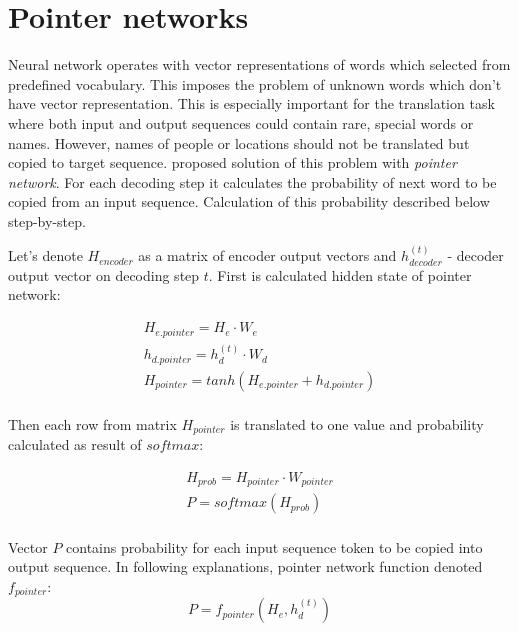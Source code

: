 \section{Pointer networks} \label{pointer}
Neural network operates with vector representations of words which selected from predefined vocabulary. This imposes the problem of unknown words which don't have vector representation. This is especially important for the translation task where both input and output sequences could contain rare, special words or names. However, names of people or locations should not be translated but copied to target sequence. \cite{Vinyals2015} proposed solution of this problem with \emph{pointer network}. For each decoding step it calculates the probability of next word to be copied from an input sequence. Calculation of this probability described below step-by-step.

Let's denote $H_{encoder}$ as a matrix of encoder output vectors and $h_{decoder}^{(t)}$ - decoder output vector on decoding step $t$. First is calculated hidden state of pointer network:

\begin{equation}
    \begin{gathered}
    
    H_{e.pointer} = H_e \cdot W_{e}\\
    
    h_{d.pointer} = h_{d}^{(t)} \cdot W_{d}\\
    
    H_{pointer} = tanh(H_{e.pointer} + h_{d.pointer})\\
    
    \end{gathered}
    \label{eq:pointer}
\end{equation}

Then each row from matrix $H_{pointer}$ is translated to one value and probability calculated as result of $softmax$:

\begin{equation}
    \begin{gathered}
    
    H_{prob} = H_{pointer} \cdot W_{pointer}\\
    
    P = softmax(H_{prob})\\
    
    \end{gathered}
\end{equation}

Vector $P$ contains probability for each input sequence token to be copied into output sequence. In following explanations, pointer network function denoted $f_{pointer}$:
\begin{equation}
    P = f_{pointer}(H_e, h_d^{(t)})
\end{equation}

